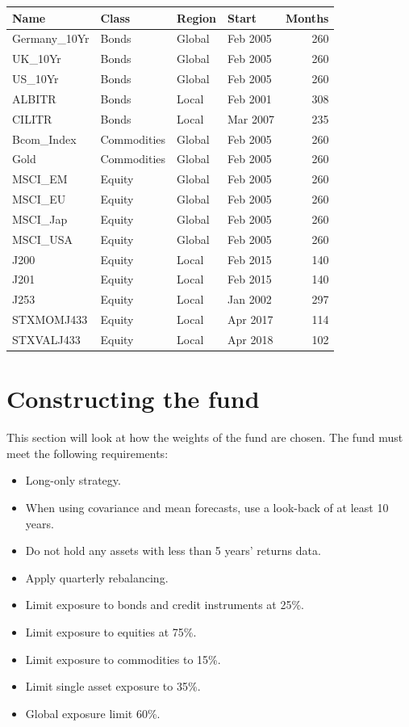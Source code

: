 \documentclass[11pt,preprint]{elsarticle}
\let\origtable\table
\let\endorigtable\endtable
\renewenvironment{table}[1][2] {
    \expandafter\origtable\expandafter[H]
} {
    \endorigtable
}
\numberwithin{equation}{section}
\numberwithin{figure}{section}
\numberwithin{table}{section}
\def\tightlist{} %
\begin{document}
\begin{table}[H]
\centering
\begin{tabular}{llllr}
  \hline
Name & Class & Region & Start & Months \\ 
  \hline
Germany\_10Yr & Bonds & Global & Feb 2005 & 260 \\ 
  UK\_10Yr & Bonds & Global & Feb 2005 & 260 \\ 
  US\_10Yr & Bonds & Global & Feb 2005 & 260 \\ 
  ALBITR & Bonds & Local & Feb 2001 & 308 \\ 
  CILITR & Bonds & Local & Mar 2007 & 235 \\ 
  Bcom\_Index & Commodities & Global & Feb 2005 & 260 \\ 
  Gold & Commodities & Global & Feb 2005 & 260 \\ 
  MSCI\_EM & Equity & Global & Feb 2005 & 260 \\ 
  MSCI\_EU & Equity & Global & Feb 2005 & 260 \\ 
  MSCI\_Jap & Equity & Global & Feb 2005 & 260 \\ 
  MSCI\_USA & Equity & Global & Feb 2005 & 260 \\ 
  J200 & Equity & Local & Feb 2015 & 140 \\ 
  J201 & Equity & Local & Feb 2015 & 140 \\ 
  J253 & Equity & Local & Jan 2002 & 297 \\ 
  STXMOMJ433 & Equity & Local & Apr 2017 & 114 \\ 
  STXVALJ433 & Equity & Local & Apr 2018 & 102 \\ 
   \hline
\end{tabular}
\caption{Assets available to the fund \label{Table_Assets}} 
\end{table}

\section{\texorpdfstring{Constructing the fund
\label{Construction}}{Constructing the fund }}\label{constructing-the-fund}

This section will look at how the weights of the fund are chosen. The
fund must meet the following requirements:

\begin{itemize}
\tightlist
\item
  Long-only strategy.
\item
  When using covariance and mean forecasts, use a look-back of at least
  10 years.
\item
  Do not hold any assets with less than 5 years' returns data.
\item
  Apply quarterly rebalancing.
\item
  Limit exposure to bonds and credit instruments at 25\%.
\item
  Limit exposure to equities at 75\%.
\item
  Limit exposure to commodities to 15\%.
\item
  Limit single asset exposure to 35\%.
\item
  Global exposure limit 60\%.
\end{itemize}
\end{document}
